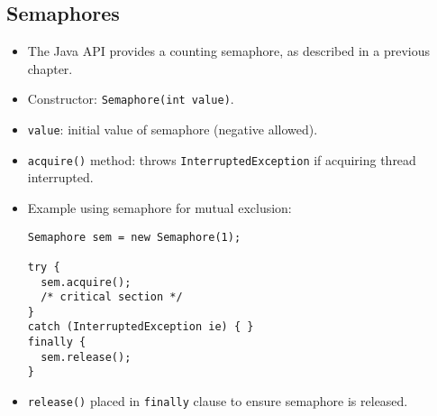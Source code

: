 \subsection{Semaphores}
\begin{itemize}
    \item The Java API provides a counting semaphore, as described in a previous chapter.
    \item Constructor: \texttt{Semaphore(int value)}.
    \item \texttt{value}: initial value of semaphore (negative allowed).
    \item \texttt{acquire()} method: throws \texttt{InterruptedException} if acquiring thread interrupted.
    \item Example using semaphore for mutual exclusion:
    \begin{verbatim}
Semaphore sem = new Semaphore(1);
 
try {
  sem.acquire();
  /* critical section */
}
catch (InterruptedException ie) { }
finally {
  sem.release();
}
    \end{verbatim}
    \item \texttt{release()} placed in \texttt{finally} clause to ensure semaphore is released.
\end{itemize}

